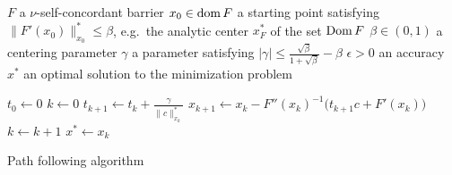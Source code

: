 \begin{algorithm}[ht]
  \begin{algorithmic}[1]
    \Require
      \Statex $F$ a $\nu$-self-concordant barrier
      \Statex $x_0 \in \operatorname{dom} F$ a starting point satisfying $\|F'(x_0)\|^*_{x_0} \leq \beta$, e.g.\ the analytic center $x^*_F$ of the set $\operatorname{Dom} F$
      \Statex $\beta \in (0,1)$ a centering parameter
      \Statex $\gamma$ a parameter satisfying $|\gamma| \leq \frac{\sqrt{\beta}}{1+\sqrt{\beta}} - \beta$
      \Statex $\epsilon > 0$ an accuracy
    \Ensure
      \Statex $x^*$ an optimal solution to the minimization problem 
      \Statex

    \State $t_0 \gets 0$
    \State $k \gets 0$
      \State $t_{k+1} \gets t_k + \frac{\gamma}{\|c\|^*_{x_k}}$
      \State $x_{k+1} \gets x_k - F''(x_k)^{-1}\big(t_{k+1}c + F'(x_k)\big)$
      \State $k \gets k + 1$
    \EndWhile
    \State \Return $x^* \gets x_k$

  \end{algorithmic}
  \caption{Path following algorithm}
\end{algorithm}
